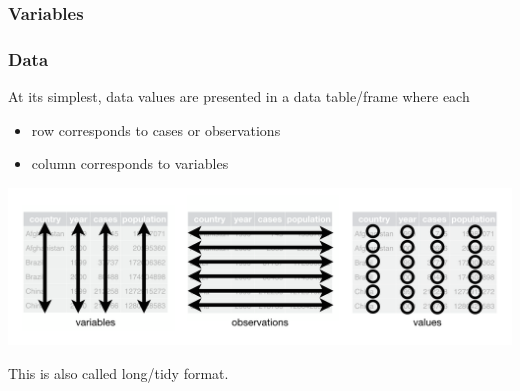 \documentclass[slides]{beamer}
\newcommand{\blue}[1]{\textcolor{blue2}{#1}}
\begin{document}
\begin{frame}[fragile]
\frametitle{Variables}

%
%
%
%
%
%
%
%
%


\end{frame}



\begin{frame}
\frametitle{Data}

At its simplest, data values are presented in a data table/frame where each
\begin{itemize}
\pause\item row corresponds to \blue{cases} or \blue{observations}
\pause\item column corresponds to \blue{variables}
\end{itemize}

\begin{center}
\pause\includegraphics[width=\linewidth]{figure/tidy} 
\end{center}

\pause This is also called \blue{long/tidy} format. 
\end{frame}
\end{document}
